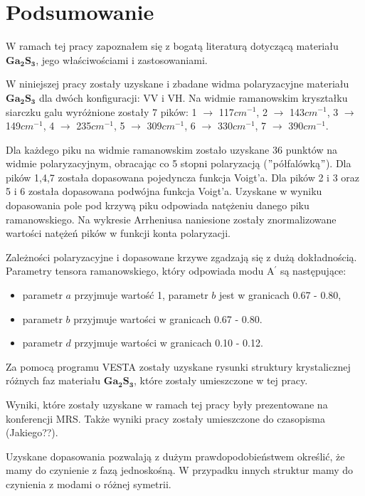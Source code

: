 \newpage

\section{Podsumowanie}

W ramach tej pracy zapoznałem się z bogatą literaturą dotyczącą materiału $\mathbf{Ga_{2}S_{3}}$, jego właściwościami i zastosowaniami.

W niniejszej pracy zostały uzyskane i zbadane widma polaryzacyjne materiału $\mathbf{Ga_{2}S_{3}}$ dla dwóch konfiguracji: VV i VH. Na widmie ramanowskim kryształku siarczku galu wyróżnione zostały 7 pików: 1 $\rightarrow$ 117$cm^{-1}$, 2 $\rightarrow$ 143$cm^{-1}$, 3 $\rightarrow$ 149$cm^{-1}$, 4 $\rightarrow$ 235$cm^{-1}$, 5 $\rightarrow$ 309$cm^{-1}$, 6 $\rightarrow$ 330$cm^{-1}$, 7 $\rightarrow$ 390$cm^{-1}$. 

Dla każdego piku na widmie ramanowskim zostało uzyskane 36 punktów na widmie polaryzacyjnym, obracając co 5 stopni polaryzacją ($"$półfalówką$"$). Dla pików 1,4,7 została dopasowana pojedyncza funkcja Voigt'a. Dla pików 2 i 3 oraz 5 i 6 została dopasowana podwójna funkcja Voigt'a. Uzyskane w wyniku dopasowania pole pod krzywą piku odpowiada natężeniu danego piku ramanowskiego. Na wykresie Arrheniusa naniesione zostały znormalizowane wartości natężeń pików w funkcji konta polaryzacji.

Zależności polaryzacyjne i dopasowane krzywe zgadzają się z dużą dokładnością. Parametry tensora ramanowskiego, który odpowiada modu A$^{'}$ są następujące:
\begin{itemize}
	\item parametr $a$ przyjmuje wartość 1, parametr $b$ jest w granicach 0.67 - 0.80, 
	\item parametr $b$ przyjmuje wartości w granicach 0.67 - 0.80.
	\item parametr $d$ przyjmuje wartości w granicach 0.10 - 0.12.
\end{itemize}

Za pomocą programu VESTA zostały uzyskane rysunki struktury krystalicznej różnych faz materiału $\mathbf{Ga_{2}S_{3}}$, które zostały umieszczone w tej pracy.

Wyniki, które zostały uzyskane w ramach tej pracy były prezentowane na konferencji MRS. Także wyniki pracy zostały umieszczone do czasopisma (Jakiego??).

Uzyskane dopasowania pozwalają z dużym prawdopodobieństwem określić, że mamy do czynienie z fazą jednoskośną. W przypadku innych struktur mamy do czynienia z modami o różnej symetrii.


